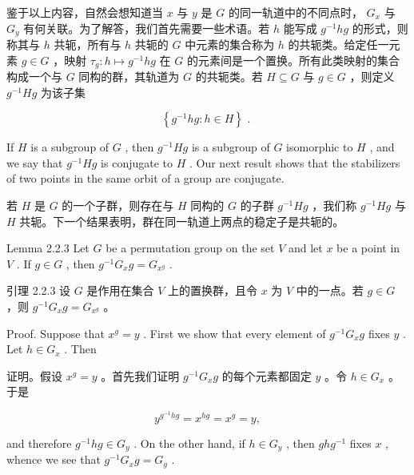 \documentclass[10pt]{article}
\begin{document}
\begin{tcolorbox}\relax
鉴于以上内容，自然会想知道当 \(x\) 与 \(y\) 是 \(G\) 的同一轨道中的不同点时， \({G}_{x}\) 与 \({G}_{y}\) 有何关联。为了解答，我们首先需要一些术语。若 \(h\) 能写成 \({g}^{-1}{hg}\) 的形式，则称其与 \(h\) 共轭，所有与 \(h\) 共轭的 \(G\) 中元素的集合称为 \(h\) 的共轭类。给定任一元素 \(g \in  G\) ，映射 \({\tau }_{g} : h \mapsto  {g}^{-1}{hg}\) 在 \(G\) 的元素间是一个置换。所有此类映射的集合构成一个与 \(G\) 同构的群，其轨道为 \(G\) 的共轭类。若 \(H \subseteq  G\) 与 \(g \in  G\) ，则定义 \({g}^{-1}{Hg}\) 为该子集
\end{tcolorbox}

\[
\left\{  {{g}^{-1}{hg} : h \in  H}\right\}  \text{ . }
\]

If \(H\) is a subgroup of \(G\) , then \({g}^{-1}{Hg}\) is a subgroup of \(G\) isomorphic to \(H\) , and we say that \({g}^{-1}{Hg}\) is conjugate to \(H\) . Our next result shows that the stabilizers of two points in the same orbit of a group are conjugate.

\begin{tcolorbox}\relax
若 \(H\) 是 \(G\) 的一个子群，则存在与 \(H\) 同构的 \(G\) 的子群 \({g}^{-1}{Hg}\) ，我们称 \({g}^{-1}{Hg}\) 与 \(H\) 共轭。下一个结果表明，群在同一轨道上两点的稳定子是共轭的。
\end{tcolorbox}

Lemma 2.2.3 Let \(G\) be a permutation group on the set \(V\) and let \(x\) be a point in \(V\) . If \(g \in  G\) , then \({g}^{-1}{G}_{x}g = {G}_{{x}^{g}}\) .

\begin{tcolorbox}\relax
引理 2.2.3 设 \(G\) 是作用在集合 \(V\) 上的置换群，且令 \(x\) 为 \(V\) 中的一点。若 \(g \in  G\) ，则 \({g}^{-1}{G}_{x}g = {G}_{{x}^{g}}\) 。
\end{tcolorbox}

Proof. Suppose that \({x}^{g} = y\) . First we show that every element of \({g}^{-1}{G}_{x}g\) fixes \(y\) . Let \(h \in  {G}_{x}\) . Then

\begin{tcolorbox}\relax
证明。假设 \({x}^{g} = y\) 。首先我们证明 \({g}^{-1}{G}_{x}g\) 的每个元素都固定 \(y\) 。令 \(h \in  {G}_{x}\) 。于是
\end{tcolorbox}

\[
{y}^{{g}^{-1}{hg}} = {x}^{hg} = {x}^{g} = y,
\]

and therefore \({g}^{-1}{hg} \in  {G}_{y}\) . On the other hand, if \(h \in  {G}_{y}\) , then \({gh}{g}^{-1}\) fixes \(x\) , whence we see that \({g}^{-1}{G}_{x}g = {G}_{y}\) .
\end{document}
